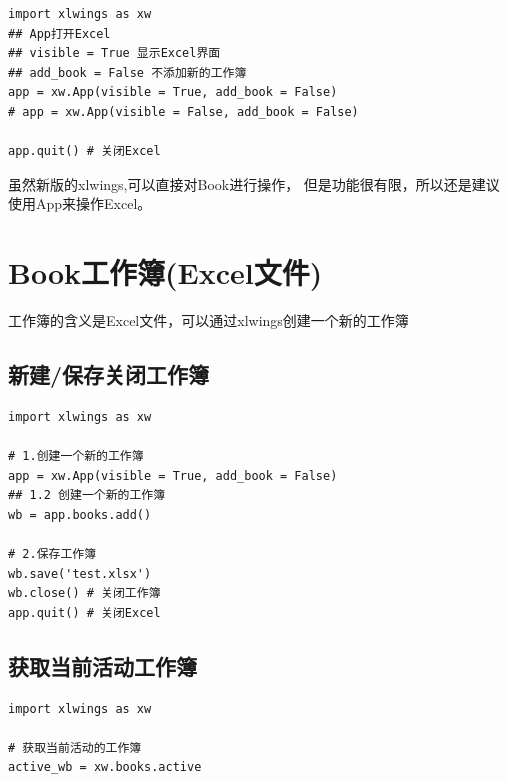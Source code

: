 \begin{lstlisting}[style=demostyle,numbers=none]
import xlwings as xw
## App打开Excel
## visible = True 显示Excel界面
## add_book = False 不添加新的工作簿
app = xw.App(visible = True, add_book = False) 
# app = xw.App(visible = False, add_book = False) 

app.quit() # 关闭Excel
\end{lstlisting}

虽然新版的xlwings,可以直接对Book进行操作，
但是功能很有限，所以还是建议使用App来操作Excel。

\section{Book工作簿(Excel文件)}
工作簿的含义是Excel文件，可以通过xlwings创建一个新的工作簿

\subsection{新建/保存关闭工作簿}
\begin{lstlisting}[style=demostyle,numbers=none]
import xlwings as xw

# 1.创建一个新的工作簿
app = xw.App(visible = True, add_book = False) 
## 1.2 创建一个新的工作簿
wb = app.books.add()

# 2.保存工作簿
wb.save('test.xlsx')
wb.close() # 关闭工作簿
app.quit() # 关闭Excel
\end{lstlisting}

\subsection{获取当前活动工作簿}
\begin{lstlisting}[style=demostyle,numbers=none]
import xlwings as xw

# 获取当前活动的工作簿
active_wb = xw.books.active
\end{lstlisting}


